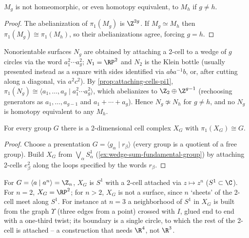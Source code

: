 \begin{corollary}
\label{cor:genus-surfaces-distinct}
$M_g$ is not homeomorphic, or even homotopy equivalent, to $M_h$ if $g\ne h$.
\end{corollary}

\begin{proof}
The abelianization of $\pi_1(M_g)$ is $\Z^{2g}$. If $M_g\simeq M_h$ then
$\pi_1(M_g)\cong\pi_1(M_h)$, so their abelianizations agree, forcing $g=h$.
\end{proof}

Nonorientable surfaces $N_g$ are obtained by attaching a 2-cell to a wedge of $g$
circles via the word $a_1^2\cdots a_g^2$; $N_1 = \RP^2$ and $N_2$ is the Klein bottle
(usually presented instead as a square with sides identified via $aba^{-1}b$, or, after
cutting along a diagonal, via $a^2c^2$). By \cref{prop:attaching-cells-pi1},
$\pi_1(N_g) \cong \langle a_1,\ldots,a_g \mid a_1^2\cdots a_g^2\rangle$, which abelianizes to
$\Z_2 \oplus \Z^{g-1}$ (rechoosing generators as $a_1,\ldots,a_{g-1}$ and
$a_1+\cdots+a_g$). Hence $N_g \not\simeq N_h$ for $g\ne h$, and no $N_g$ is homotopy
equivalent to any $M_h$.



\begin{corollary}
\label{cor:every-group-realized-as-pi1}
For every group $G$ there is a 2-dimensional cell complex $X_G$ with
$\pi_1(X_G) \cong G$.
\end{corollary}

\begin{proof}
Choose a presentation $G = \langle g_\alpha \mid r_\beta\rangle$ (every group is a quotient of a
free group). Build $X_G$ from $\bigvee_\alpha S^1_\alpha$ (\cref{ex:wedge-sum-fundamental-group}) by
attaching 2-cells $e_\beta^2$ along the loops specified by the words $r_\beta$.
\end{proof}

\begin{example}[$X_G$ for $G=\Z_n$]
\label{ex:cyclic-group-complex-xg}
For $G = \langle a \mid a^n\rangle = \Z_n$, $X_G$ is $S^1$ with a 2-cell attached via
$z\mapsto z^n$ ($S^1\subset\C$). For $n=2$, $X_G = \RP^2$; for $n>2$, $X_G$ is not a
surface, since $n$ `sheets' of the 2-cell meet along $S^1$. For instance at $n=3$ a
neighborhood of $S^1$ in $X_G$ is built from the graph $\Upsilon$ (three edges from a
point) crossed with $I$, glued end to end with a one-third twist; its boundary is a
single circle, to which the rest of the 2-cell is attached -- a construction that needs
$\R^4$, not $\R^3$.


\end{example}

